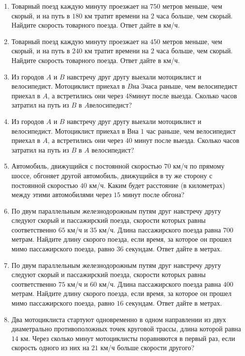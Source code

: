 \documentclass[12pt, a4paper]{article}
\begin{document}
\begin{enumerate}
		\item Товарный поезд каждую минуту проезжает на \( 750 \) метров меньше, чем скорый, и на путь в \( 180 \) км тратит времени на \( 2 \) часа больше, чем скорый. Найдите скорость товарного поезда. Ответ дайте в км/ч.
		\item Товарный поезд каждую минуту проезжает на \( 450 \) метров меньше, чем скорый, и на путь в \( 240 \) км тратит времени на \( 2 \) часа больше, чем скорый. Найдите скорость товарного поезда. Ответ дайте в км/ч.
		\item Из городов \( A \) и \( B  \) навстречу друг другу выехали мотоциклист и велосипедист. Мотоциклист приехал в \(B\)на \(3\)часа раньше, чем велосипедист приехал в \( A \), а встретились они через \(48\)минут после выезда. Сколько часов затратил на путь из \( B  \) в \( A  \)велосипедист?
		\item Из городов \( A  \) и \( B  \) навстречу друг другу выехали мотоциклист и велосипедист. Мотоциклист приехал в \(В\)на \(1\) час раньше, чем велосипедист приехал в \( A \), а встретились они через \(40\) минут после выезда. Сколько часов затратил на путь из \(  B  \) в \( A  \) велосипедист?
		\item Автомобиль, движущийся с постоянной скоростью \( 70  \) км/ч по прямому шоссе, обгоняет другой автомобиль, движущийся в ту же сторону с постоянной скоростью \( 40  \) км/ч. Каким будет расстояние (в километрах) между этими автомобилями через \( 15  \) минут после обгона?
		\item По двум параллельным железнодорожным путям друг навстречу другу следуют скорый и пассажирский поезда, скорости которых равны соответственно \( 65  \) км/ч и \( 35  \) км/ч. Длина пассажирского поезда равна \( 700  \) метрам. Найдите длину скорого поезда, если время, за которое он прошел мимо пассажирского поезда, равно \( 36  \) секундам. Ответ дайте в метрах.
		\item По двум параллельным железнодорожным путям друг навстречу другу следуют скорый и пассажирский поезда, скорости которых равны соответственно \( 75  \) км/ч и \( 60  \) км/ч. Длина пассажирского поезда равна \( 400  \) метрам. Найдите длину скорого поезда, если время, за которое он прошел мимо пассажирского поезда, равно \( 16  \) секундам. Ответ дайте в метрах.
		\item Два мотоциклиста стартуют одновременно в одном направлении из двух диаметрально противоположных точек круговой трассы, длина которой равна \( 14  \) км. Через сколько минут мотоциклисты поравняются в первый раз, если скорость одного из них на \( 21  \) км/ч больше скорости другого?

\end{enumerate}
\end{document}
